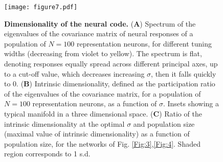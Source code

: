 \documentclass[a4paper]{article}%
\begin{document}
\begin{figure}[ptb]
\centering
\texttt{[image: figure7.pdf]}\caption{\textbf{Dimensionality of the neural code.} (\textbf{A}) Spectrum of the eigenvalues of the covariance matrix of neural responses of a population of $N=100$ representation neurons, for different tuning widths (decreasing from violet to yellow). The spectrum is flat, denoting responses equally spread across different principal axes, up to a cut-off value, which decreases increasing $\sigma$, then it falls quickly to 0. (\textbf{B}) Intrinsic dimensionality, defined as the participation ratio of the eigenvalues of the covariance matrix, for a population of $N=100$ representation neurons, as a function of $\sigma$. Insets showing a typical manifold in a three dimensional space. (\textbf{C}) Ratio of the intrinsic dimensionality at the optimal $\sigma$ and population size (maximal value of intrinsic dimensionality) as a function of population size, for the networks of Fig. \ref{Fig:3},\ref{Fig:4}. Shaded region corresponds to 1 s.d.}
\label{Fig:7}
\end{figure}
\clearpage
\end{document}
